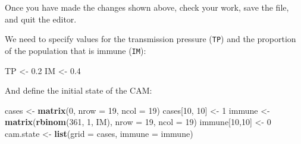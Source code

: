 \documentclass[12pt,a4paper]{book}
\newenvironment{Shaded}{\begin{snugshade}}{\end{snugshade}}
\newcommand{\ControlFlowTok}[1]{\textcolor[rgb]{0.13,0.29,0.53}{\textbf{#1}}}
\newcommand{\DataTypeTok}[1]{\textcolor[rgb]{0.13,0.29,0.53}{#1}}
\newcommand{\DecValTok}[1]{\textcolor[rgb]{0.00,0.00,0.81}{#1}}
\newcommand{\FloatTok}[1]{\textcolor[rgb]{0.00,0.00,0.81}{#1}}
\newcommand{\KeywordTok}[1]{\textcolor[rgb]{0.13,0.29,0.53}{\textbf{#1}}}
\newcommand{\NormalTok}[1]{#1}
\newcommand{\OperatorTok}[1]{\textcolor[rgb]{0.81,0.36,0.00}{\textbf{#1}}}
\newcommand{\StringTok}[1]{\textcolor[rgb]{0.31,0.60,0.02}{#1}}
\theoremstyle{definition}
\theoremstyle{definition}
\theoremstyle{definition}
\theoremstyle{remark}
\begin{document}
\begin{Shaded}
\end{Shaded}

Once you have made the changes shown above, check your work, save the
file, and quit the editor.

We need to specify values for the transmission pressure (\texttt{TP})
and the proportion of the population that is immune (\texttt{IM}):

\begin{Shaded}
\begin{Highlighting}[]
\NormalTok{TP <-}\StringTok{ }\FloatTok{0.2}
\NormalTok{IM <-}\StringTok{ }\FloatTok{0.4}
\end{Highlighting}
\end{Shaded}

And define the initial state of the CAM:

\begin{Shaded}
\begin{Highlighting}[]
\NormalTok{cases <-}\StringTok{ }\KeywordTok{matrix}\NormalTok{(}\DecValTok{0}\NormalTok{, }\DataTypeTok{nrow =} \DecValTok{19}\NormalTok{, }\DataTypeTok{ncol =} \DecValTok{19}\NormalTok{)}
\NormalTok{cases[}\DecValTok{10}\NormalTok{, }\DecValTok{10}\NormalTok{] <-}\StringTok{ }\DecValTok{1}
\NormalTok{immune <-}\StringTok{ }\KeywordTok{matrix}\NormalTok{(}\KeywordTok{rbinom}\NormalTok{(}\DecValTok{361}\NormalTok{, }\DecValTok{1}\NormalTok{, IM), }\DataTypeTok{nrow =} \DecValTok{19}\NormalTok{, }\DataTypeTok{ncol =} \DecValTok{19}\NormalTok{)}
\NormalTok{immune[}\DecValTok{10}\NormalTok{,}\DecValTok{10}\NormalTok{] <-}\StringTok{ }\DecValTok{0}
\NormalTok{cam.state <-}\StringTok{ }\KeywordTok{list}\NormalTok{(}\DataTypeTok{grid =}\NormalTok{ cases, }\DataTypeTok{immune =}\NormalTok{ immune)}
\end{Highlighting}
\end{Shaded}
\end{document}
